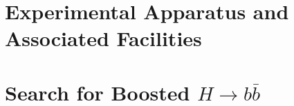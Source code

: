 \documentclass[11pt]{ucthesis}
\begin{document}
\begin{spacing}{2.0}



\part{Experimental Apparatus and Associated Facilities}
\label{part:experiment}




\part{Search for Boosted $H \rightarrow b\bar{b}$}
\label{part:HbbISR}










\printbibliography

\end{spacing}
\end{document}
